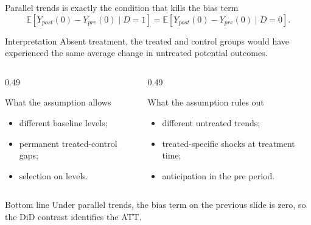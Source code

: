 \documentclass[10pt]{beamer}
\newcommand{\E}{\mathbb{E}}
\begin{document}
\begin{frame}{Parallel trends is exactly the condition that kills the bias term}
\label{slide:did_pt}
\small
\[
\E[Y_{post}(0)-Y_{pre}(0)\mid D=1]
=
\E[Y_{post}(0)-Y_{pre}(0)\mid D=0].
\]

\begin{block}{Interpretation}
Absent treatment, the treated and control groups would have experienced the same average change in untreated potential outcomes.
\end{block}

\begin{columns}[T]
\begin{column}{0.49\textwidth}
\begin{exampleblock}{What the assumption allows}
\begin{itemize}
  \item different baseline levels;
  \item permanent treated-control gaps;
  \item selection on levels.
\end{itemize}
\end{exampleblock}
\end{column}
\begin{column}{0.49\textwidth}
\begin{alertblock}{What the assumption rules out}
\begin{itemize}
  \item different untreated trends;
  \item treated-specific shocks at treatment time;
  \item anticipation in the pre period.
\end{itemize}
\end{alertblock}
\end{column}
\end{columns}

\begin{exampleblock}{Bottom line}
Under parallel trends, the bias term on the previous slide is zero, so the DiD contrast identifies the ATT.
\end{exampleblock}
\end{frame}
\end{document}
